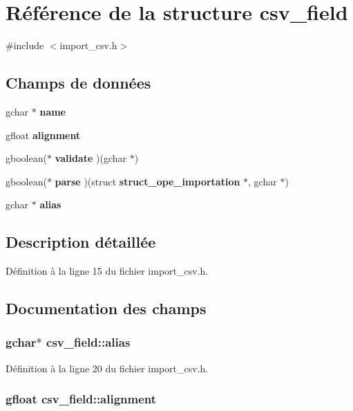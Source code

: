\section{Référence de la structure csv\_\-field}
\label{structcsv__field}


{\ttfamily \#include $<$import\_\-csv.h$>$}

\subsection*{Champs de données}
\begin{DoxyCompactItemize}
\item 
gchar $\ast$ {\bf name}
\item 
gfloat {\bf alignment}
\item 
gboolean($\ast$ {\bf validate} )(gchar $\ast$)
\item 
gboolean($\ast$ {\bf parse} )(struct {\bf struct\_\-ope\_\-importation} $\ast$, gchar $\ast$)
\item 
gchar $\ast$ {\bf alias}
\end{DoxyCompactItemize}


\subsection{Description détaillée}


Définition à la ligne 15 du fichier import\_\-csv.h.



\subsection{Documentation des champs}
\subsubsection[{alias}]{\setlength{\rightskip}{0pt plus 5cm}gchar$\ast$ {\bf csv\_\-field::alias}}\label{structcsv__field_a3938c8ac2fe0b71288fc69728f41492e}


Définition à la ligne 20 du fichier import\_\-csv.h.

\subsubsection[{alignment}]{\setlength{\rightskip}{0pt plus 5cm}gfloat {\bf csv\_\-field::alignment}}\label{structcsv__field_a70d0989d4b8daa809b7ef91cf1b06d5f}


